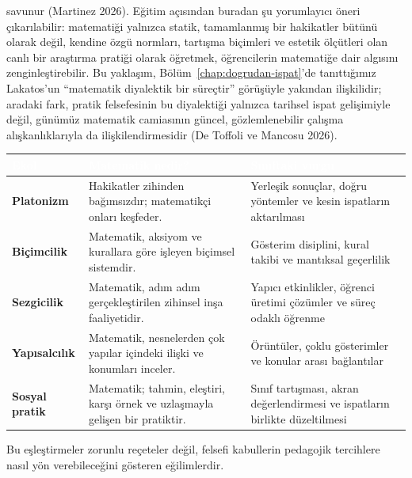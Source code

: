 savunur (Martinez 2026). Eğitim açısından buradan şu yorumlayıcı öneri çıkarılabilir: matematiği yalnızca statik, tamamlanmış bir hakikatler bütünü olarak değil, kendine özgü normları, tartışma biçimleri ve estetik ölçütleri olan canlı bir araştırma pratiği olarak öğretmek, öğrencilerin matematiğe dair algısını zenginleştirebilir. Bu yaklaşım, Bölüm~\ref{chap:dogrudan-ispat}’de tanıttığımız Lakatos’un “matematik diyalektik bir süreçtir” görüşüyle yakından ilişkilidir; aradaki fark, pratik felsefesinin bu diyalektiği yalnızca tarihsel ispat gelişimiyle değil, günümüz matematik camiasının güncel, gözlemlenebilir çalışma alışkanlıklarıyla da ilişkilendirmesidir (De Toffoli ve Mancosu 2026).

\par\smallskip\begin{center}{\renewcommand{\arraystretch}{1.25}\footnotesize\begin{tabularx}{\linewidth}{|>{\raggedright\arraybackslash}p{2.10cm}|Y|Y|}\hline
{}\textcolor{white}{\bfseries Ekol} & \textcolor{white}{\bfseries Matematik nedir?} & \textcolor{white}{\bfseries Sınıftaki vurgu} \\ \hline
\textbf{Platonizm} & Hakikatler zihinden bağımsızdır; matematikçi onları keşfeder. & Yerleşik sonuçlar, doğru yöntemler ve kesin ispatların aktarılması \\ \hline
\textbf{Biçimcilik} & Matematik, aksiyom ve kurallara göre işleyen biçimsel sistemdir. & Gösterim disiplini, kural takibi ve mantıksal geçerlilik \\ \hline
\textbf{Sezgicilik} & Matematik, adım adım gerçekleştirilen zihinsel inşa faaliyetidir. & Yapıcı etkinlikler, öğrenci üretimi çözümler ve süreç odaklı öğrenme \\ \hline
\textbf{Yapısalcılık} & Matematik, nesnelerden çok yapılar içindeki ilişki ve konumları inceler. & Örüntüler, çoklu gösterimler ve konular arası bağlantılar \\ \hline
\textbf{Sosyal pratik} & Matematik; tahmin, eleştiri, karşı örnek ve uzlaşmayla gelişen bir pratiktir. & Sınıf tartışması, akran değerlendirmesi ve ispatların birlikte düzeltilmesi \\ \hline
\end{tabularx}}\end{center}\par\smallskip

Bu eşleştirmeler zorunlu reçeteler değil, felsefi kabullerin pedagojik tercihlere nasıl yön verebileceğini gösteren eğilimlerdir.

